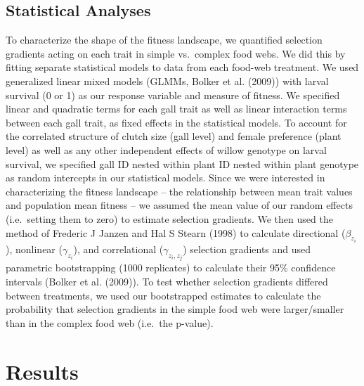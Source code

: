 \documentclass[]{elsarticle} %
\begin{document}
\subsection{Statistical Analyses}\label{statistical-analyses}

To characterize the shape of the fitness landscape, we quantified
selection gradients acting on each trait in simple vs.~complex food
webs. We did this by fitting separate statistical models to data from
each food-web treatment. We used generalized linear mixed models (GLMMs,
Bolker et al. (2009)) with larval survival (0 or 1) as our response
variable and measure of fitness. We specified linear and quadratic terms
for each gall trait as well as linear interaction terms between each
gall trait, as fixed effects in the statistical models. To account for
the correlated structure of clutch size (gall level) and female
preference (plant level) as well as any other independent effects of
willow genotype on larval survival, we specified gall ID nested within
plant ID nested within plant genotype as random intercepts in our
statistical models. Since we were interested in characterizing the
fitness landscape -- the relationship between mean trait values and
population mean fitness -- we assumed the mean value of our random
effects (i.e.~setting them to zero) to estimate selection gradients. We
then used the method of Frederic J Janzen and Hal S Stearn (1998) to
calculate directional (\(\beta_{z_i}\)), nonlinear (\(\gamma_{z_i}\)),
and correlational (\(\gamma_{z_i,z_j}\)) selection gradients and used
parametric bootstrapping (1000 replicates) to calculate their 95\%
confidence intervals (Bolker et al. (2009)). To test whether selection
gradients differed between treatments, we used our bootstrapped
estimates to calculate the probability that selection gradients in the
simple food web were larger/smaller than in the complex food web
(i.e.~the p-value).

\section{Results}\label{results}
\end{document}
